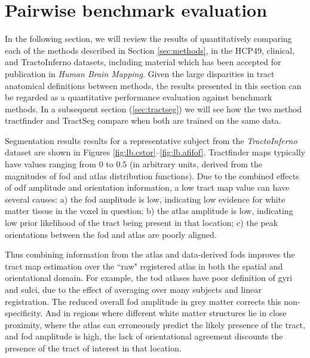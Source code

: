 \section{Pairwise benchmark evaluation}
\label{sec:validation}

In the following section, we will review the results of quantitatively comparing each of the methods described in Section \ref{sec:methods}, in the HCP49, clinical, and TractoInferno datasets, including material which has been accepted for publication in \textit{Human Brain Mapping}\autocite{Young2024}.
Given the large disparities in tract anatomical definitions between methods, the results presented in this section can be regarded as a quantitative performance evaluation against benchmark methods.
In a subsequent section (\ref{sec:tractseg}) we will see how the two method tractfinder and TractSeg compare when both are trained on the same data.

Segmentation results results for a representative subject from the \textit{TractoInferno} dataset are shown in Figures \ref{fig:lb.cstor}--\ref{fig:lb.afifof}.
Tractfinder maps typically have values ranging from 0 to 0.5 (in arbitrary units, derived from the magnitudes of \gls{fod} and atlas distribution functions).
Due to the combined effects of \gls{odf} amplitude and orientation information, a low tract map value can have several causes: a) the \gls{fod} amplitude is low, indicating low evidence for white matter tissue in the voxel in question; b) the atlas amplitude is low, indicating low prior likelihood of the tract being present in that location; c) the peak orientations between the \gls{fod} and atlas are poorly aligned.

Thus combining information from the atlas and data-derived \glspl{fod} improves the tract map estimation over the ``raw" registered atlas in both the spatial and orientational domain. For example, the \gls{tod} atlases have poor definition of gyri and sulci, due to the effect of averaging over many subjects and linear registration. The reduced overall \gls{fod} amplitude in grey matter corrects this non-specificity. And in regions where different white matter structures lie in close proximity, where the atlas can erroneously predict the likely presence of the tract, and \gls{fod} amplitude is high, the lack of orientational agreement discounts the presence of the tract of interest in that location.

